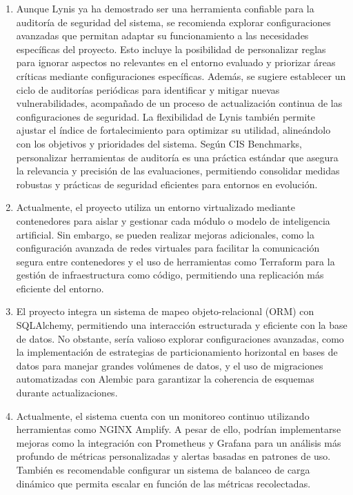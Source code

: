 \begin{enumerate}
    \item Aunque Lynis ya ha demostrado ser una herramienta confiable para la auditoría de seguridad del sistema, se recomienda explorar configuraciones avanzadas que permitan adaptar su funcionamiento a las necesidades específicas del proyecto. Esto incluye la posibilidad de personalizar reglas para ignorar aspectos no relevantes en el entorno evaluado y priorizar áreas críticas mediante configuraciones específicas. Además, se sugiere establecer un ciclo de auditorías periódicas para identificar y mitigar nuevas vulnerabilidades, acompañado de un proceso de actualización continua de las configuraciones de seguridad. La flexibilidad de Lynis también permite ajustar el índice de fortalecimiento para optimizar su utilidad, alineándolo con los objetivos y prioridades del sistema. Según CIS Benchmarks, personalizar herramientas de auditoría es una práctica estándar que asegura la relevancia y precisión de las evaluaciones, permitiendo consolidar medidas robustas y prácticas de seguridad eficientes para entornos en evolución.

    \item Actualmente, el proyecto utiliza un entorno virtualizado mediante contenedores para aislar y gestionar cada módulo o modelo de inteligencia artificial. Sin embargo, se pueden realizar mejoras adicionales, como la configuración avanzada de redes virtuales para facilitar la comunicación segura entre contenedores y el uso de herramientas como Terraform para la gestión de infraestructura como código, permitiendo una replicación más eficiente del entorno.

    \item El proyecto integra un sistema de mapeo objeto-relacional (ORM) con SQLAlchemy, permitiendo una interacción estructurada y eficiente con la base de datos. No obstante, sería valioso explorar configuraciones avanzadas, como la implementación de estrategias de particionamiento horizontal en bases de datos para manejar grandes volúmenes de datos, y el uso de migraciones automatizadas con Alembic para garantizar la coherencia de esquemas durante actualizaciones.

    \item Actualmente, el sistema cuenta con un monitoreo continuo utilizando herramientas como NGINX Amplify. A pesar de ello, podrían implementarse mejoras como la integración con Prometheus y Grafana para un análisis más profundo de métricas personalizadas y alertas basadas en patrones de uso. También es recomendable configurar un sistema de balanceo de carga dinámico que permita escalar en función de las métricas recolectadas.


\end{enumerate}
